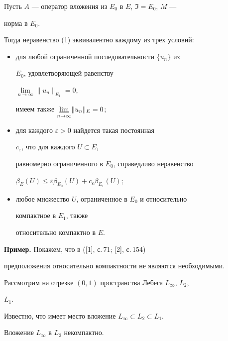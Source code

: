  


\begin{cor} 


Пусть $A$ --- оператор вложения из $E_0$ в $E$, $\Im=E_0$, $M$ --- 


норма в $E_0$.  


Тогда неравенство (1) эквивалентно каждому из трех условий: 


\begin{itemize} 


\item[$1'$.] для любой ограниченной последовательности $\{u_n\}$ из 


$E_0$, удовлетворяющей равенству 


$\lim\limits_{n\to\infty}\|u_n\|_{E_1}=0$,


имеем также $\underset{n\to\infty}{\varliminf}{}\|u_n\|_E=0$; 


\item[$2'$.] для каждого $\varepsilon>0$ найдется такая постоянная 


$c_\varepsilon$, что для каждого $U\subset E$, 


равномерно ограниченного в $E_0$, справедливо неравенство 


$\beta_E(U)\le\varepsilon\beta_{E_0}(U)+ 


c_\varepsilon\beta_{E_1}(U)$; 


\item[$3'$.] любое множество $U$, ограниченное в $E_0$ и относительно 


компактное в $E_1$, также  


относительно компактно в $E$. 


\end{itemize} 


\end{cor} 


 


{\bf Пример.} Покажем, что в ([1], с.\,71; [2], с.\,154) 


предположения относительно компактности не являются необходимыми. 


 


Рассмотрим на отрезке $(0,1)$ пространства Лебега $L_\infty$, $L_2$, 


$L_1$. 


Известно, что имеет место вложение $L_\infty\subset L_2\subset L_1$. 


Вложение $L_\infty$ в $L_2$ некомпактно.  


